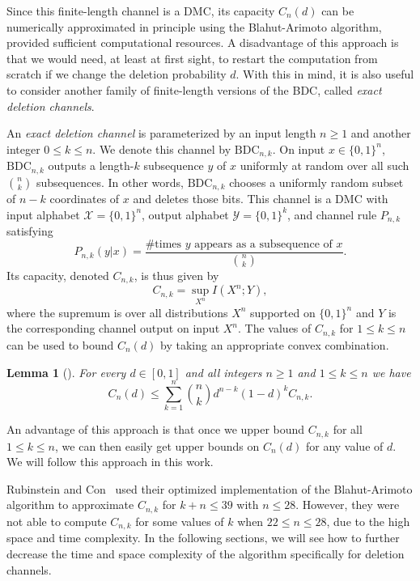 \documentclass[11pt]{article}
\newcommand{\cX}{\mathcal{X}}
\newcommand{\cY}{\mathcal{Y}}
\newtheorem{lemma}{Lemma}
\newcommand{\bits}{\{0,1\}}
\newcommand{\BDC}{\mathrm{BDC}}
\newcommand{\fCap}{C}
\begin{document}
Since this finite-length channel is a DMC, its capacity $\fCap_n(d)$ can be numerically approximated in principle using the Blahut-Arimoto algorithm, provided sufficient computational resources.
A disadvantage of this approach is that we would need, at least at first sight, to restart the computation from scratch if we change the deletion probability $d$.
With this in mind, it is also useful to consider another family of finite-length versions of the BDC, called \emph{exact deletion channels}.



An \emph{exact deletion channel} is parameterized by an input length $n\geq 1$ and another integer $0\leq k\leq n$.
We denote this channel by $\BDC_{n,k}$.
On input $x\in\bits^n$, $\BDC_{n,k}$ outputs a length-$k$ subsequence $y$ of $x$ uniformly at random over all such $\binom{n}{k}$ subsequences.
In other words, $\BDC_{n,k}$ chooses a uniformly random subset of $n-k$ coordinates of $x$ and deletes those bits.
This channel is a DMC with input alphabet $\cX=\bits^n$, output alphabet $\cY=\bits^k$, and channel rule $P_{n,k}$ satisfying
\begin{equation*}
    P_{n,k}(y|x)=\frac{\# \textrm{times $y$ appears as a subsequence of $x$}}{\binom{n}{k}}.
\end{equation*}
Its capacity, denoted $C_{n,k}$, is thus given by
\begin{equation*}
    C_{n,k} = \sup_{X^n} I(X^n; Y),
\end{equation*}
where the supremum is over all distributions $X^n$ supported on $\bits^n$ and $Y$ is the corresponding channel output on input $X^n$.
The values of $C_{n,k}$ for $1\leq k\leq n$ can be used to bound $C_n(d)$ by taking an appropriate convex combination.
\begin{lemma}[]\label{lem:prob-vs-exact}
    For every $d\in[0,1]$ and all integers $n\geq 1$ and $1\leq k\leq n$ we have
    \begin{equation*}
        C_n(d) \leq \sum_{k=1}^n \binom{n}{k}d^{n-k}(1-d)^kC_{n,k}.
    \end{equation*}
\end{lemma}
An advantage of this approach is that once we upper bound $C_{n,k}$ for all $1\leq k\leq n$, we can then easily get upper bounds on $C_n(d)$ for any value of $d$.
We will follow this approach in this work.



Rubinstein and Con~\cite{RC23} used their optimized implementation of the Blahut-Arimoto algorithm to approximate $C_{n,k}$ for $k + n \leq 39$ with $n\leq 28$. However, they were not able to compute $C_{n,k}$ for some values of $k$ when $22 \leq n \leq 28$, due to the high space and time complexity. In the following sections, we will see how to further decrease the time and space complexity of the algorithm specifically for deletion channels.
\end{document}
